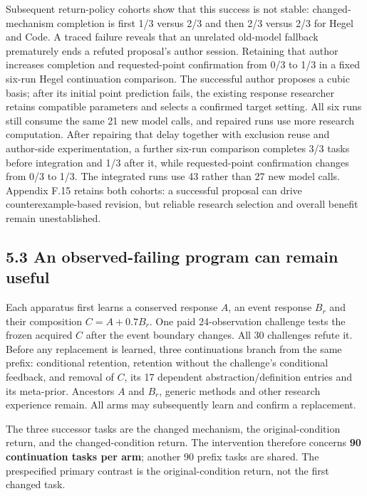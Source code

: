 \documentclass[11pt,a4paper]{article}
\begin{document}
Subsequent return-policy cohorts show that this success is not stable: changed-mechanism completion is first 1/3 versus 2/3 and then 2/3 versus 2/3 for Hegel and Code. A traced failure reveals that an unrelated old-model fallback prematurely ends a refuted proposal's author session. Retaining that author increases completion and requested-point confirmation from 0/3 to 1/3 in a fixed six-run Hegel continuation comparison. The successful author proposes a cubic basis; after its initial point prediction fails, the existing response researcher retains compatible parameters and selects a confirmed target setting. All six runs still consume the same 21 new model calls, and repaired runs use more research computation. After repairing that delay together with exclusion reuse and author-side experimentation, a further six-run comparison completes 3/3 tasks before integration and 1/3 after it, while requested-point confirmation changes from 0/3 to 1/3. The integrated runs use 43 rather than 27 new model calls. Appendix F.15 retains both cohorts: a successful proposal can drive counterexample-based revision, but reliable research selection and overall benefit remain unestablished.


\subsection*{5.3 An observed-failing program can remain useful}

Each apparatus first learns a conserved response \(A\), an event response \(B_r\) and their composition \(C=A+0.7B_r\). One paid 24-observation challenge tests the frozen acquired \(C\) after the event boundary changes. All 30 challenges refute it. Before any replacement is learned, three continuations branch from the same prefix: conditional retention, retention without the challenge's conditional feedback, and removal of \(C\), its 17 dependent abstraction/definition entries and its meta-prior. Ancestors \(A\) and \(B_r\), generic methods and other research experience remain. All arms may subsequently learn and confirm a replacement.


The three successor tasks are the changed mechanism, the original-condition return, and the changed-condition return. The intervention therefore concerns \textbf{90 continuation tasks per arm}; another 90 prefix tasks are shared. The prespecified primary contrast is the original-condition return, not the first changed task.
\end{document}

